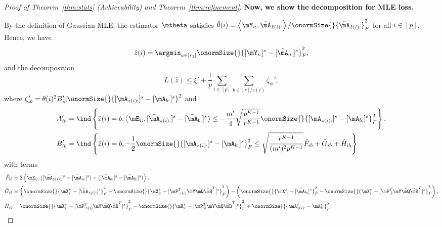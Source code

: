 \documentclass[lettersize,onecolumn,journal]{IEEEtran}
\theoremstyle{definition}
\theoremstyle{definition}
\newcommand{\of}[1]{\left(#1\right)}
\newcommand{\offf}[1]{\left\{#1\right\}}
\newcommand{\ang}[1]{\left\langle#1\right\rangle}
\begin{document}
\begin{proof}[Proof of Theorem~\ref{thm:stats} (Achievability) and Theorem~\ref{thm:refinement}]
    {
      
    
    \textbf{Now, we show the decomposition for MLE loss.}
     
    By the definition of Gaussian MLE, the estimator $\hat \mtheta$ satisfies $\hat \theta(i)  = \ang{ \mY_{i:} , \hat \mA_{\hat z(i):} }/{\onormSize{}{ \hat \mA_{\hat z(i):}}_F^2}$ for all $i \in [p]$.
Hence, we have 
\begin{equation}
    \hat z(i) = \argmin_{a \in [r_1]} \onormSize{}{ [\mY_{ i:}]^s - [\hat \mA_{a:}]^s}_F^2,
\end{equation}
and the decomposition 
 \begin{equation}
        L(\hat z) \leq \xi' + \frac{1}{p}\sum_{i \in [p] }  \sum_{b \in [r]/z(i)}  \zeta_{ib}', 
    \end{equation}
    where $ \zeta_{ib}' =   \theta(i)^2 B_{ib}' \onormSize{}{ [ \mA_{ z(i):}  ]^s - [ \mA_{b:}  ]^s  }^2$ and 
    \begin{align}
        A'_{ib} &= \ind \offf{  \hat z(i)  = b,   \ang{\mE_{i:}, [\bar \mA_{z(i):}]^s - [\bar \mA_{b:}]^s }  \leq - \frac{m'}{4}  \sqrt{\frac{p^{K-1}}{r^{K-1}}} \onormSize{}{ [\mA_{z(i):}]^s -  [\mA_{b:}]^s  }_F^2 }, \\
    B'_{ib} &= \ind \offf{  \hat z(i)  = b,     - \frac{1}{2}  \onormSize{}{ [\mA_{z(i):}]^s -  [\mA_{b:}]^s  }_F^2  \leq \sqrt{\frac{r^{K-1}}{(m')^2 p^{K-1}}}  \hat F_{ib} + \hat G_{ib} + \hat H_{ib} }
    \end{align}
    with terms 
    \begin{align}
    \hat F_{ib} &= 2 \ang{ \mE_{i:}, ([\bar  \mA_{z(i):}]^s - [\hat \mA_{a:}]^s) - ([\bar  \mA_{b:}]^s - [\hat \mA_{b:}]^s) }, \\
    \hat G_{ib}& = \of{ \onormSize{}{\mX_{i:}^s - [\hat \mA_{z(i):}]^s}_F^2 - \onormSize{}{ \mX^s_{i:} - [\mP_{:z(i)}^T \mY \hat \mQ \hat \mB^T ]^s }_F^2  } - \of{ \onormSize{}{\mX^s_{i:} - [\hat \mA_{b:}]^s}_F^2 - \onormSize{}{ \mX^s_{i:} - [\mP_{:b}^T \mY \hat \mQ \hat \mB^T]^s }_F^2   }, \\
   \hat  H_{ib}& = \onormSize{}{ \mX^s_{i:} - [\mP_{:z(i)}^T \mY \hat \mQ \hat \mB^T]^s }_F^2 - \onormSize{}{ \mX^s_{i:} - [\mP_{:b}^T \mY \hat \mQ \hat \mB^T]^s }_F^2 + \onormSize{}{ \mA^s_{z(i):} -  \mA^s_{b:}  }_F^2.
\end{align}
    
    }
   



\end{proof}
\end{document}
